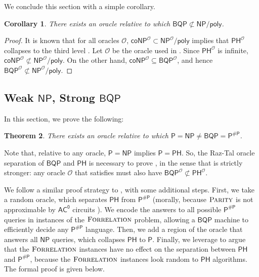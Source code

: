 \documentclass[10pt,a4paper]{article}
\newtheorem{theorem}{Theorem}
\newtheorem{corollary}[theorem]{Corollary}
\newcommand{\PARITY}{\normalfont\textsc{Parity}}
\newcommand{\Forrelation}{\normalfont\textsc{Forrelation}}
\begin{document}
We conclude this section with a simple corollary.

\begin{corollary}
\label{cor:bqp_not_in_np/poly}
There exists an oracle relative to which $\mathsf{BQP}\not \subset
\mathsf{NP/poly}$.
\end{corollary}

\begin{proof}
It is known that for all oracles $\mathcal{O}$, $\mathsf{coNP}^\mathcal{O}\subset\mathsf{NP}^\mathcal{O}/\mathsf{poly}$ implies that $\mathsf{PH}^\mathcal{O}$ collapses to the third level \cite{Yap83}. %
Let $\mathcal{O}$ be the oracle used in . Since $\mathsf{PH}^\mathcal{O}$ is infinite, $\mathsf{coNP}^\mathcal{O}\not\subset\mathsf{NP}^\mathcal{O}/\mathsf{poly}$. On the other hand, $\mathsf{coNP}^\mathcal{O}\subseteq\mathsf{BQP}^\mathcal{O}$, and hence $\mathsf{BQP}^\mathcal{O}\not\subset\mathsf{NP}^\mathcal{O}/\mathsf{poly}$.
\end{proof}

\subsection{Weak \texorpdfstring{$\mathsf{NP}$}{NP}, Strong \texorpdfstring{$\mathsf{BQP}$}{BQP}}

In this section, we prove the following:


\begin{theorem}
\label{thm:p=np_bqp=pp}
There exists an oracle relative to which $\mathsf{P}=\mathsf{NP}%
\neq\mathsf{BQP}=\mathsf{P}^{\mathsf{\#P}}$.
\end{theorem}


Note that, relative to any oracle, $\mathsf{P} = \mathsf{NP}$ implies $\mathsf{P} = \mathsf{PH}$. So, the Raz-Tal oracle separation of $\mathsf{BQP}$ and $\mathsf{PH}$ \cite{RT19} is necessary to prove , in the sense that  is strictly stronger: any oracle $\mathcal{O}$ that satisfies  must also have $\mathsf{BQP}^\mathcal{O} \not\subset \mathsf{PH}^\mathcal{O}$. 

We follow a similar proof strategy to , with some additional steps. First, we take a random oracle, which separates $\mathsf{PH}$ from $\mathsf{P}^\mathsf{\#P}$ (morally, because $\PARITY$ is not approximable by $\mathsf{AC^0}$ circuits \cite{Has87}). We encode the answers to all possible $\mathsf{P}^\mathsf{\# P}$ queries in instances of the $\Forrelation$ problem, allowing a $\mathsf{BQP}$ machine to efficiently decide any $\mathsf{P}^\mathsf{\# P}$ language. Then, we add a region of the oracle that answers all $\mathsf{NP}$ queries, which collapses $\mathsf{PH}$ to $\mathsf{P}$. Finally, we leverage  to argue that the $\Forrelation$ instances have no effect on the separation between $\mathsf{PH}$ and $\mathsf{P}^\mathsf{\#P}$, because the $\Forrelation$ instances look random to $\mathsf{PH}$ algorithms. The formal proof is given below.
\end{document}
